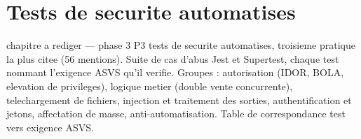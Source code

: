 ﻿%
\chapter{Tests de securite automatises}
\label{chap:tests}

\begin{constat}{chapitre a rediger --- phase 3}
P3 tests de securite automatises, troisieme pratique la plus citee (56 mentions). Suite de cas d'abus Jest et Supertest, chaque test nommant l'exigence ASVS qu'il verifie. Groupes : autorisation (IDOR, BOLA, elevation de privileges), logique metier (double vente concurrente), telechargement de fichiers, injection et traitement des sorties, authentification et jetons, affectation de masse, anti-automatisation. Table de correspondance test vers exigence ASVS.
\end{constat}
